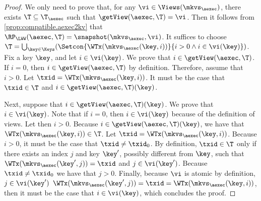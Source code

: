 \begin{proof}
We only need to prove that, for any $\vi \in \Views(\mkvs_{\aexec})$, there exists $\T \subseteq \T_{\aexec}$ such 
that $\getView(\aexec, \T) = \vi$. Then it follows from \cref{prop:compatible.aexec2kv} that 
$\RP_{\LWW}(\aexec, \T) = \snapshot(\mkvs_{\aexec}, \vi)$. 
It suffices to choose $\T = \bigcup_{\key \in \Keys}(\Setcon{ \WTx(\mkvs_{\aexec}(\key, i)) }{ i > 0 
\wedge i \in \vi(\key)})$.
Fix a key $\key$, and let $i \in \vi(\key)$. We prove that $i \in \getView(\aexec, \T)$. 
If $i = 0$, then $i \in \getView(\aexec, \T)$ by definition. 
Therefore, assume that $i > 0$. Let $\txid = \WTx(\mkvs_{\aexec}(\key, i))$.
It must be the case that $\txid \in \T$ and $i \in \getView(\aexec, \T)(\key)$.

Next, suppose that $i \in \getView(\aexec, \T)(\key)$. We prove that $i \in \vi(\key)$.
Note that if $i = 0$, then $i \in \vi(\key)$ because of the 
definition of views. Let then $i > 0$. Because $i \in \getView(\aexec, \T)(\key)$, we have that 
$\WTx(\mkvs_{\aexec}(\key, i)) \in \T$.  Let $\txid = \WTx(\mkvs_{\aexec}(\key, i))$. Because $i > 0$, 
it must be the case that $\txid \neq \txid_0$.
By definition, $\txid \in \T$ only if there 
exists an index $j$ and key $\key'$, possibly different from $\key$, such that $\WTx(\mkvs_{\aexec}(\key', j)) = \txid$ and $j \in \vi(\key')$. 
Because $\txid \neq \txid_0$ we have that $j > 0$. Finally, because $\vi$ is atomic by definition, $j \in \vi(\key')$
$\WTx(\mkvs_{\aexec}(\key', j)) = \txid = \WTx(\mkvs_{\aexec}(\key, i))$, then it must be the case 
that $i \in \vi(\key)$, which concludes the proof.
\end{proof}

